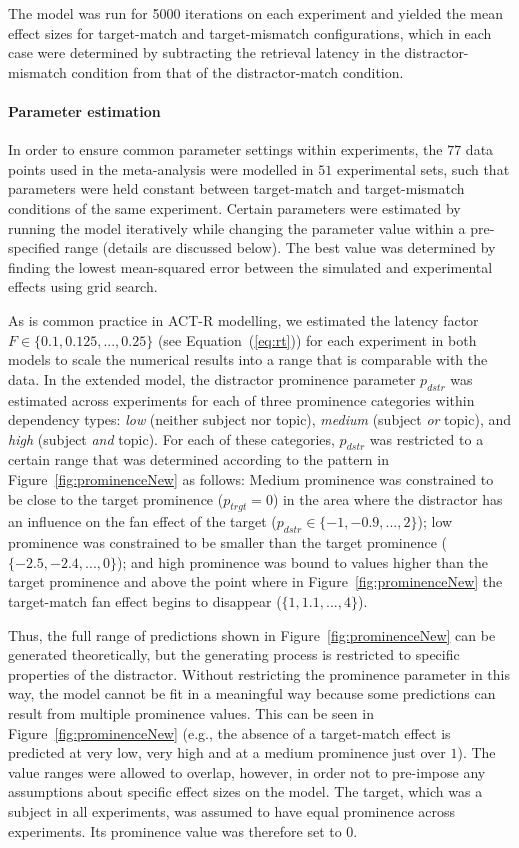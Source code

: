 \documentclass{cambridge7A}\usepackage[]{graphicx}\usepackage[]{color}
\begin{document}
The model was run for 5000 iterations on each experiment and yielded the mean effect sizes for target-match and target-mismatch configurations, which in each case were determined by subtracting the retrieval latency in the distractor-mismatch condition from that of the distractor-match condition.


\paragraph{Parameter estimation}
In order to ensure common parameter settings within experiments, the $77$ data points used in the meta-analysis were modelled in $51$ experimental sets, such that parameters were held constant between target-match and target-mismatch conditions of the same experiment. Certain parameters were estimated by running the model iteratively while changing the parameter value within a pre-specified range (details are discussed below). 
The best value was determined by finding the lowest mean-squared error between the simulated and experimental effects using grid search.

As is common practice in ACT-R modelling, we estimated the latency factor $F \in \{0.1, 0.125, ..., 0.25\}$ (see Equation~(\ref{eq:rt})) for each experiment in both models to scale the numerical results into a range that is comparable with the data.
In the extended model, the distractor prominence parameter $p_{dstr}$ was estimated across experiments for each of three prominence categories within dependency types: \emph{low} (neither subject nor topic), \emph{medium} (subject \emph{or} topic), and \emph{high} (subject \emph{and} topic).
For each of these categories, $p_{dstr}$ was restricted to a certain range that was determined according to the pattern in Figure~\ref{fig:prominenceNew} as follows:
Medium prominence was constrained to be close to the target prominence ($p_{trgt} = 0$) in the area where the distractor has an influence on the fan effect of the target ($p_{dstr} \in \{-1, -0.9, ..., 2\}$); low prominence was constrained to be smaller than the target prominence ($\{-2.5, -2.4, ..., 0\}$); and high prominence was bound to values higher than the target prominence and above the point where in Figure~\ref{fig:prominenceNew} the target-match fan effect begins to disappear ($\{1, 1.1, ..., 4\}$).

Thus, the full range of predictions shown in Figure~\ref{fig:prominenceNew} can be generated theoretically, but the generating process is restricted to specific properties of the distractor. 
Without restricting the prominence parameter in this way, the model cannot be fit in a meaningful way because some predictions can result from multiple prominence values. This can be seen in Figure~\ref{fig:prominenceNew} (e.g., the absence of a target-match effect is predicted at very low, very high and at a medium prominence just over $1$).
The value ranges were allowed to overlap, however, in order not to pre-impose any assumptions about specific effect sizes on the model.
The target, which was a subject in all experiments, was assumed to have equal prominence across experiments. Its prominence value was therefore set to $0$.
\end{document}
